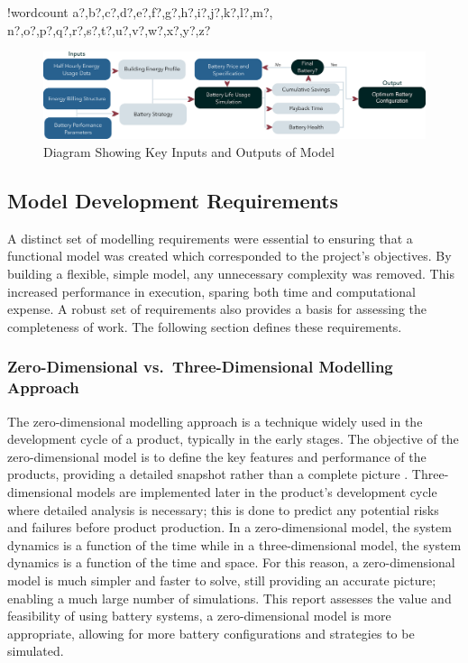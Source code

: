 \documentclass[fontsize=9.5pt]{extarticle}
\numberwithin{figure}{section} %
\newcounter{words}
\newenvironment{counted}{%
  \setcounter{words}{0}
  \SearchList!{wordcount}{\stepcounter{words}}
    {a?,b?,c?,d?,e?,f?,g?,h?,i?,j?,k?,l?,m?,
    n?,o?,p?,q?,r?,s?,t?,u?,v?,w?,x?,y?,z?}
  \UndoBoundary{'}
  \SearchOrder{p;}}{%
  \StopSearching}
\begin{document}
\begin{counted}
\begin{figure}[H]
 \centering
 \includegraphics[trim = 0 0 0 0, clip, width=1\textwidth]{SystemLogic1.eps}
 \caption{Diagram Showing Key Inputs and Outputs of Model}
 \label{SystemLogic1}
 \end{figure}

\subsection{Model Development
Requirements}\label{model-development-requirements}

A distinct set of modelling requirements were essential to ensuring that
a functional model was created which corresponded to the project's
objectives. By building a flexible, simple model, any unnecessary
complexity was removed. This increased performance in execution, sparing
both time and computational expense. A robust set of requirements also
provides a basis for assessing the completeness of work. The following
section defines these requirements.

\subsubsection{Zero-Dimensional vs.~Three-Dimensional Modelling
Approach}\label{zero-dimensional-vs.three-dimensional-modelling-approach}

The zero-dimensional modelling approach is a technique widely used in
the development cycle of a product, typically in the early stages. The
objective of the zero-dimensional model is to define the key features
and performance of the products, providing a detailed snapshot rather
than a complete picture \autocite[online]{ZeroDMod80}. Three-dimensional
models are implemented later in the product's development cycle where
detailed analysis is necessary; this is done to predict any potential
risks and failures before product production. In a zero-dimensional
model, the system dynamics is a function of the time while in a
three-dimensional model, the system dynamics is a function of the time
and space. For this reason, a zero-dimensional model is much simpler and
faster to solve, still providing an accurate picture; enabling a much
large number of simulations. This report assesses the value and
feasibility of using battery systems, a zero-dimensional model is more
appropriate, allowing for more battery configurations and strategies to
be simulated.


\end{counted}
\end{document}
